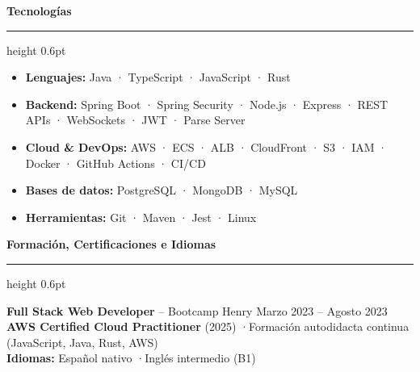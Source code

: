 \documentclass[10pt,a4paper]{article}
\renewcommand{\section}[2]{%
  \par\vspace{7pt}%
  {\large\bfseries\color{accent}#2}\par\vspace{1pt}%
  {\color{accent}\hrule height 0.6pt}\vspace{4pt}%
}
\begin{document}
\section*{Tecnologías}
\begin{itemize}
  \item \textbf{Lenguajes:} Java · TypeScript · JavaScript · Rust
  \item \textbf{Backend:} Spring Boot · Spring Security · Node.js · Express · REST APIs ·
        WebSockets · JWT · Parse Server
  \item \textbf{Cloud \& DevOps:} AWS · ECS · ALB · CloudFront · S3 · IAM · Docker ·
        GitHub Actions · CI/CD
  \item \textbf{Bases de datos:} PostgreSQL · MongoDB · MySQL
  \item \textbf{Herramientas:} Git · Maven · Jest · Linux
\end{itemize}

\section*{Formación, Certificaciones e Idiomas}
\textbf{Full Stack Web Developer} -- Bootcamp Henry \hfill {\small Marzo 2023 -- Agosto 2023}\\
\textbf{AWS Certified Cloud Practitioner} (2025) \quad·\quad Formación autodidacta continua (JavaScript, Java, Rust, AWS)\\
\textbf{Idiomas:} Español nativo \quad·\quad Inglés intermedio (B1)
\end{document}
